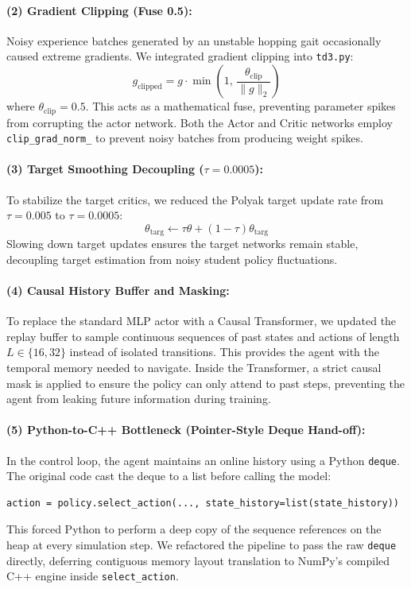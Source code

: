 \documentclass[11pt,a4paper]{article}
\begin{document}
\paragraph{(2) Gradient Clipping (Fuse 0.5):}
Noisy experience batches generated by an unstable hopping gait occasionally caused extreme gradients. We integrated gradient clipping into \texttt{td3.py}:
\begin{equation}
g_{\text{clipped}} = g \cdot \min\left(1, \, \frac{\theta_{\text{clip}}}{\|g\|_2}\right)
\end{equation}
where $\theta_{\text{clip}} = 0.5$. This acts as a mathematical fuse, preventing parameter spikes from corrupting the actor network. Both the Actor and Critic networks employ \texttt{clip\_grad\_norm\_} to prevent noisy batches from producing weight spikes.

\paragraph{(3) Target Smoothing Decoupling ($\tau=0.0005$):}
To stabilize the target critics, we reduced the Polyak target update rate from $\tau=0.005$ to $\tau=0.0005$:
\begin{equation}
\theta_{\text{targ}} \leftarrow \tau \theta + (1-\tau) \theta_{\text{targ}}
\end{equation}
Slowing down target updates ensures the target networks remain stable, decoupling target estimation from noisy student policy fluctuations.

\paragraph{(4) Causal History Buffer and Masking:}
To replace the standard MLP actor with a Causal Transformer, we updated the replay buffer to sample continuous sequences of past states and actions of length $L \in \{16, 32\}$ instead of isolated transitions. This provides the agent with the temporal memory needed to navigate. Inside the Transformer, a strict causal mask is applied to ensure the policy can only attend to past steps, preventing the agent from leaking future information during training.

\paragraph{(5) Python-to-C++ Bottleneck (Pointer-Style Deque Hand-off):}
In the control loop, the agent maintains an online history using a Python \texttt{deque}. The original code cast the deque to a list before calling the model:
\begin{lstlisting}[caption=Old Inefficient Conversion]
action = policy.select_action(..., state_history=list(state_history))
\end{lstlisting}
This forced Python to perform a deep copy of the sequence references on the heap at every simulation step. We refactored the pipeline to pass the raw \texttt{deque} directly, deferring contiguous memory layout translation to NumPy's compiled C++ engine inside \texttt{select\_action}.
\end{document}
